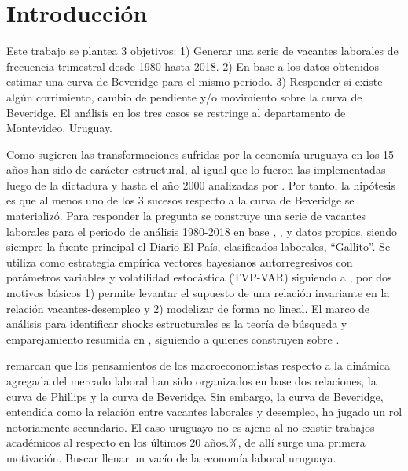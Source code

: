 \documentclass[msc,oneside,a4paper]{udelar} %
\begin{document}
  \hypertarget{intro}{%
  \chapter{Introducción}\label{intro}}
  
  Este trabajo se plantea 3 objetivos: 1) Generar una serie de vacantes laborales de frecuencia trimestral desde 1980 hasta 2018. 2) En base a los datos obtenidos estimar una curva de Beveridge para el mismo periodo. 3) Responder si existe algún corrimiento, cambio de pendiente y/o movimiento sobre la curva de Beveridge. El análisis en los tres casos se restringe al departamento de Montevideo, Uruguay.
  
  Como sugieren \cite{Bergara2017} las transformaciones sufridas por la economía uruguaya en los 15 años han sido de carácter estructural, al igual que lo fueron las implementadas luego de la dictadura y hasta el año 2000 analizadas por \cite{Antia2001}. Por tanto, la hipótesis es que al menos uno de los 3 sucesos respecto a la curva de Beveridge se materializó. Para responder la pregunta se construye una serie de vacantes laborales para el periodo de análisis 1980-2018 en base \cite{Rama1988}, \cite{Urrestarazu1997}, \cite{Ceres2012} y datos propios, siendo siempre la fuente principal el Diario El País, clasificados laborales, ``Gallito''. Se utiliza como estrategia empírica vectores bayesianos autorregresivos con parámetros variables y volatilidad estocástica (TVP-VAR) siguiendo a \cite{Nakajima2011, Benati2013, Primiceri2005, Lubik2016b}, por dos motivos básicos 1) permite levantar el supuesto de una relación invariante en la relación vacantes-desempleo y 2) modelizar de forma no lineal. El marco de análisis para identificar shocks estructurales es la teoría de búsqueda y emparejamiento resumida en \cite{Pissarides2000}, siguiendo a \cite{Benati2013} quienes construyen sobre \cite{Shimer2005}.
  
  \cite{Blanchard1989} remarcan que los pensamientos de los macroeconomistas respecto a la dinámica agregada del mercado laboral han sido organizados en base dos relaciones, la curva de Phillips y la curva de Beveridge. Sin embargo, la curva de Beveridge, entendida como la relación entre vacantes laborales y desempleo, ha jugado un rol notoriamente secundario. El caso uruguayo no es ajeno al no existir trabajos académicos al respecto en los últimos 20 años.\%, de allí surge una primera motivación. Buscar llenar un vacío de la economía laboral uruguaya.
  
\end{document}
